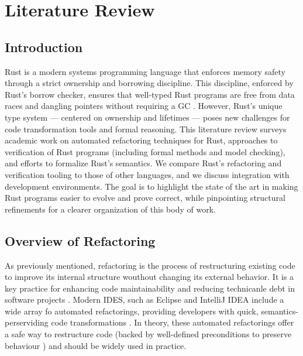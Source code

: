 \chapter[Chapter 1]{Literature Review}
\label{chap:lit_review}

\section{Introduction}
\label{sec:lit_intro}
Rust is a modern systems programming language that enforces memory safety
through a strict ownership and borrowing discipline. This discipline, enforced
by Rust's borrow checker, ensures that well-typed Rust programs are free from
data races and dangling pointers without requiring a GC
\cite{automated_refactoring_of_rust_programs}. However, Rust's unique type
system — centered on ownership and lifetimes — poses
new challenges for code transformation tools and formal reasoning. This
literature review surveys academic work on automated refactoring techniques for
Rust, approaches to verification of Rust programs (including formal methods and
model checking), and efforts to formalize Rust's semantics. We compare Rust's
refactoring and verification tooling to those of other languages, and we discuss
integration with development environments. The goal is to highlight the state of
the art in making Rust programs easier to evolve and prove correct, while
pinpointing structural refinements for a clearer organization of this body of
work.

\section{Overview of Refactoring}

As previously mentioned, refactoring is the process of restructuring existing
code to improve its internal structure wouthout changing its external behavior.
It is a key practice for enhancing code maintainability and reducing technicanle
debt in software projects \cite{OneThousandOneStories-SoftwareRefactoring}.
Modern IDES, such as Eclipse and IntelliJ IDEA include a wide array fo automated
refactorings, providing developers with quick, semantics- perserviding code
transformations \cite{AdventureOfALifetime}. In theory, these automated
refactorings offer a safe way to restructure code (backed by well-defined
preconditions to preserve behaviour \cite{Formal_Specifiation_JAVA}) and should
be widely used in practice.

